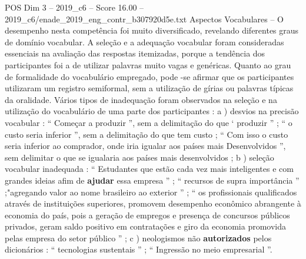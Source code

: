\begin{textsample}{POS Dim 3 – 2019\_c6 – Score 16.00 – 2019\_c6/enade\_2019\_eng\_contr\_b307920d5e.txt}
Aspectos Vocabulares – O desempenho nesta competência foi muito diversificado, revelando diferentes graus de domínio vocabular.
A seleção e a adequação vocabular foram consideradas essenciais na avaliação das respostas itemizadas, porque a tendência dos participantes foi a de utilizar palavras muito vagas e genéricas.
Quanto ao grau de formalidade do vocabulário empregado, pode -se afirmar que os participantes utilizaram um registro semiformal, sem a utilização de gírias ou palavras típicas da oralidade.
Vários tipos de inadequação foram observados na seleção e na utilização do vocabulário de uma parte dos participantes : a ) desvios na precisão vocabular : “ Começar a produzir ”, sem a delimitação do que ‘ produzir ” ; “ o custo seria inferior ”, sem a delimitação do que tem custo ; “ Com isso o custo seria inferior ao comprador, onde iria igualar aos países mais Desenvolvidos ”, sem delimitar o que se igualaria aos países mais desenvolvidos ; b ) seleção vocabular inadequada : “ Estudantes que estão cada vez mais inteligentes e com grandes ideias afim de \textbf{ajudar} essa empresa ” ; “ recursos de supra importância ” ;"agregando valor ao nome brasileiro ao exterior ” ; “ os profissionais qualificados através de instituições superiores, promovem desempenho econômico abrangente à economia do país, pois a geração de empregos e presença de concursos públicos privados, geram saldo positivo em contratações e giro da economia promovida pelas empresa do setor público ” ; c ) neologismos não \textbf{autorizados} pelos dicionários : “ tecnologias sustentais ” ; “ Ingressão no meio empresarial ”.

\end{textsample}
